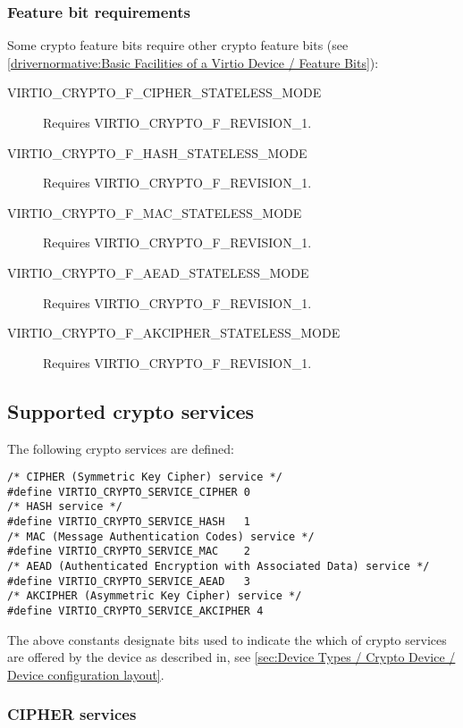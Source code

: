 \subsubsection{Feature bit requirements}\label{sec:Device Types / Crypto Device / Feature bit requirements}

Some crypto feature bits require other crypto feature bits
(see \ref{drivernormative:Basic Facilities of a Virtio Device / Feature Bits}):

\begin{description}
\item[VIRTIO_CRYPTO_F_CIPHER_STATELESS_MODE] Requires VIRTIO_CRYPTO_F_REVISION_1.
\item[VIRTIO_CRYPTO_F_HASH_STATELESS_MODE] Requires VIRTIO_CRYPTO_F_REVISION_1.
\item[VIRTIO_CRYPTO_F_MAC_STATELESS_MODE] Requires VIRTIO_CRYPTO_F_REVISION_1.
\item[VIRTIO_CRYPTO_F_AEAD_STATELESS_MODE] Requires VIRTIO_CRYPTO_F_REVISION_1.
\item[VIRTIO_CRYPTO_F_AKCIPHER_STATELESS_MODE] Requires VIRTIO_CRYPTO_F_REVISION_1.
\end{description}

\subsection{Supported crypto services}\label{sec:Device Types / Crypto Device / Supported crypto services}

The following crypto services are defined:

\begin{lstlisting}
/* CIPHER (Symmetric Key Cipher) service */
#define VIRTIO_CRYPTO_SERVICE_CIPHER 0
/* HASH service */
#define VIRTIO_CRYPTO_SERVICE_HASH   1
/* MAC (Message Authentication Codes) service */
#define VIRTIO_CRYPTO_SERVICE_MAC    2
/* AEAD (Authenticated Encryption with Associated Data) service */
#define VIRTIO_CRYPTO_SERVICE_AEAD   3
/* AKCIPHER (Asymmetric Key Cipher) service */
#define VIRTIO_CRYPTO_SERVICE_AKCIPHER 4
\end{lstlisting}

The above constants designate bits used to indicate the which of crypto services are
offered by the device as described in, see \ref{sec:Device Types / Crypto Device / Device configuration layout}.

\subsubsection{CIPHER services}\label{sec:Device Types / Crypto Device / Supported crypto services / CIPHER services}

